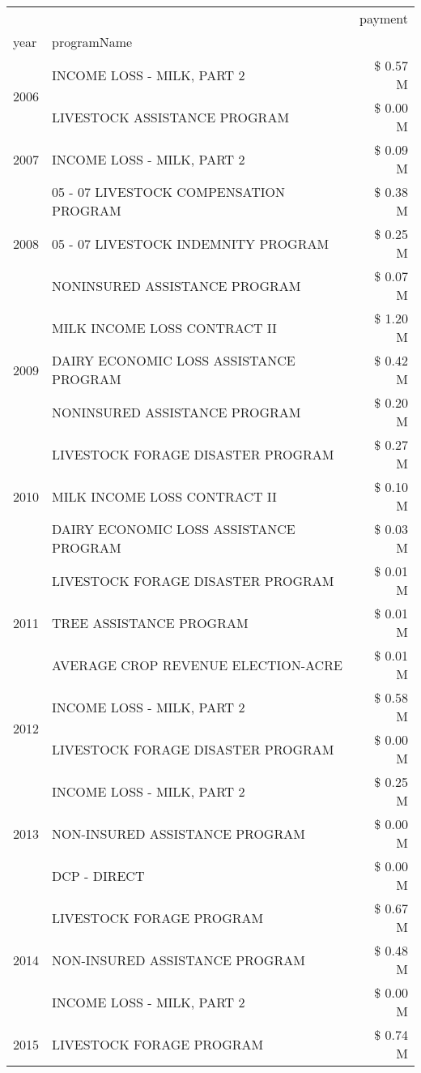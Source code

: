 \begin{tabular}{llr}
\toprule
 &  & payment \\
year & programName &  \\
\midrule
\multirow[t]{2}{*}{2006} & INCOME LOSS - MILK, PART 2 & \$ 0.57 M \\
 & LIVESTOCK ASSISTANCE PROGRAM & \$ 0.00 M \\
\cline{1-3}
2007 & INCOME LOSS - MILK, PART 2 & \$ 0.09 M \\
\cline{1-3}
\multirow[t]{3}{*}{2008} & 05 - 07 LIVESTOCK COMPENSATION PROGRAM & \$ 0.38 M \\
 & 05 - 07 LIVESTOCK INDEMNITY PROGRAM & \$ 0.25 M \\
 & NONINSURED ASSISTANCE PROGRAM & \$ 0.07 M \\
\cline{1-3}
\multirow[t]{3}{*}{2009} & MILK INCOME LOSS CONTRACT II & \$ 1.20 M \\
 & DAIRY ECONOMIC LOSS ASSISTANCE PROGRAM & \$ 0.42 M \\
 & NONINSURED ASSISTANCE PROGRAM & \$ 0.20 M \\
\cline{1-3}
\multirow[t]{3}{*}{2010} & LIVESTOCK FORAGE DISASTER  PROGRAM & \$ 0.27 M \\
 & MILK INCOME LOSS CONTRACT II & \$ 0.10 M \\
 & DAIRY ECONOMIC LOSS ASSISTANCE PROGRAM & \$ 0.03 M \\
\cline{1-3}
\multirow[t]{3}{*}{2011} & LIVESTOCK FORAGE DISASTER PROGRAM & \$ 0.01 M \\
 & TREE ASSISTANCE PROGRAM & \$ 0.01 M \\
 & AVERAGE CROP REVENUE ELECTION-ACRE & \$ 0.01 M \\
\cline{1-3}
\multirow[t]{2}{*}{2012} & INCOME LOSS - MILK, PART 2 & \$ 0.58 M \\
 & LIVESTOCK FORAGE DISASTER PROGRAM & \$ 0.00 M \\
\cline{1-3}
\multirow[t]{3}{*}{2013} & INCOME LOSS - MILK, PART 2 & \$ 0.25 M \\
 & NON-INSURED ASSISTANCE PROGRAM & \$ 0.00 M \\
 & DCP - DIRECT & \$ 0.00 M \\
\cline{1-3}
\multirow[t]{3}{*}{2014} & LIVESTOCK FORAGE PROGRAM & \$ 0.67 M \\
 & NON-INSURED ASSISTANCE PROGRAM & \$ 0.48 M \\
 & INCOME LOSS - MILK, PART 2 & \$ 0.00 M \\
\cline{1-3}
\multirow[t]{3}{*}{2015} & LIVESTOCK FORAGE PROGRAM & \$ 0.74 M \\

\end{tabular}
